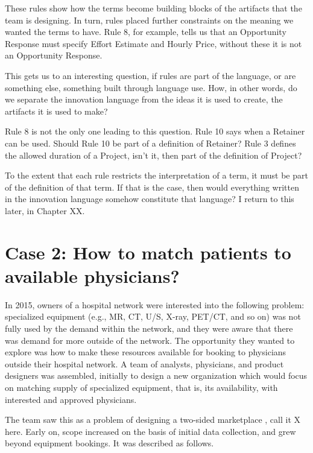 \documentclass[graybox,envcountchap,sectrefs]{svmono}
\begin{document}
These rules show how the terms become building blocks of the artifacts that the team is designing. In turn, rules placed further constraints on the meaning we wanted the terms to have. Rule 8, for example, tells us that an Opportunity Response must specify Effort Estimate and Hourly Price, without these it is not an Opportunity Response. 

This gets us to an interesting question, if rules are part of the language, or are something else, something built through language use. How, in other words, do we separate the innovation language from the ideas it is used to create, the artifacts it is used to make?

Rule 8 is not the only one leading to this question. Rule 10 says when a Retainer can be used. Should Rule 10 be part of a definition of Retainer? Rule 3 defines the allowed duration of a Project, isn't it, then part of the definition of Project?

To the extent that each rule restricts the interpretation of a term, it must be part of the definition of that term. If that is the case, then would everything written in the innovation language somehow constitute that language? I return to this later, in Chapter XX.


\section{Case 2: How to match patients to available physicians?}
\label{c5:s3}
In 2015, owners of a hospital network were interested into the following problem: specialized equipment (e.g., MR, CT, U/S, X-ray, PET/CT, and so on) was not fully used by the demand within the network, and they were aware that there was demand for more outside of the network. The opportunity they wanted to explore was how to make these resources available for booking to physicians outside their hospital network. A team of analysts, physicians, and product designers was assembled, initially to design a new organization which would focus on matching supply of specialized equipment, that is, its availability, with interested and approved physicians. 

The team saw this as a problem of designing a two-sided marketplace \cite{roson2005two,rochet2006two}, call it X here. Early on, scope increased on the basis of initial data collection, and grew beyond equipment bookings. It was described as follows.
\end{document}
